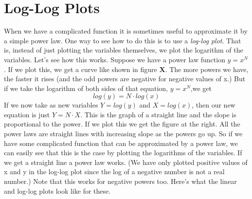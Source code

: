 \section{Log-Log Plots}
When we have a complicated function it is sometimes useful to approximate it by a simple power law.
One way to see how to do this is to use a \emph{log-log plot}.
That is, instead of just plotting the variables themselves, we plot the logarithm of the variables.
Let's see how this works.
Suppose we have a power law function $y = x^{N}$.
If we plot this, we get a curve like shown in figure \textbf{X}.
The more powers we have, the faster it rises (and the odd powers are negative for negative values of x.)
But if we take the logarithm of both sides of that equation, $y = x^{N}$,we get
\[ log(y)=N \cdot log(x) \] 
If we now take as new variables $Y = log(y)$ and $X = log(x)$, then our new equation is just $Y = N \cdot X$.
This is the graph of a straight line and the slope is proportional to the power.
If we plot this we get the figure at the right.
All the power laws are straight lines with increasing slope as the powers go up.
So if we have some complicated function that can be approximated by a power law, we can easily see that this is the case by plotting the logarithms of the variables. 
If we get a straight line a power law works. 
(We have only plotted positive values of x and y in the log-log plot since the log of a negative number is not a real number.)
Note that this works for negative powers too. 
Here's what the linear and log-log plots look like for these.

